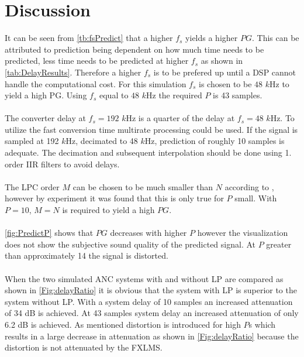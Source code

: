 \section{Discussion} \label{sec:discussion}
It can be seen from \autoref{tb:fsPredict} that a higher $f_s$ yields a higher $PG$. This can be attributed to prediction being dependent on how much time needs to be predicted, less time needs to be predicted at higher $f_s$ as shown in \autoref{tab:DelayResults}.  
Therefore a higher $f_s$ is to be prefered up until a DSP cannot handle the computational cost. For this simulation $f_s$ is chosen to be $48$ $k$Hz to yield a high PG. 
Using $f_s$ equal to $48$ $k$Hz the required $P$ is 43 samples.  
\\\\
The converter delay at $f_s=192$ $k$Hz is a quarter of the delay at $f_s=48$ $k$Hz. To utilize the fast conversion time multirate processing could be used. If the signal is sampled at 192 $k$Hz, decimated to 48 $k$Hz, prediction of roughly 10 samples is adequate. The decimation and subsequent interpolation should be done using 1. order IIR filters to avoid delays.  
\\\\
The LPC order $M$ can be chosen to be much smaller than $N$ according to \cite{Speech}, however by experiment it was found that this is only true for $P$ small. With $P=10$, $M=N$ is required to yield a high $PG$. 
\\\\
\autoref{fig:PredictP} shows that $PG$ decreases with higher $P$ however the visualization does not show the subjective sound quality of the predicted signal. At $P$ greater than approximately 14 the signal is distorted.    
\\\\
When the two simulated ANC systems with and without LP are compared as shown in \autoref{Fig:delayRatio} it is obvious that the system with LP is superior to the system without LP. With a system delay of 10 samples an increased attenuation of 34 dB is achieved. At 43 samples system delay an increased attenuation of only 6.2 dB is achieved. As mentioned distortion is introduced for high $P$s which results in a large decrease in attenuation as shown in \autoref{Fig:delayRatio} because the distortion is not attenuated by the FXLMS.
